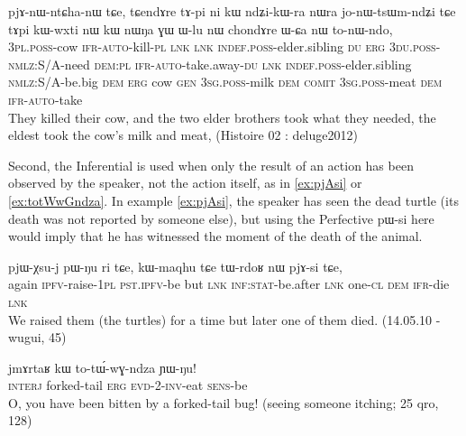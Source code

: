 \documentclass[oldfontcommands,oneside,a4paper,11pt]{article}
\newcommand{\ipa}[1]{{\phon \mbox{#1}}} %
\begin{document}
\begin{exe}
\ex \label{ex:pjAnWntChanW}
\gll  \ipa{nɯ-nɯŋa} 	\ipa{pjɤ-nɯ-ntɕha-nɯ} 	\ipa{tɕe,} \ipa{tɕendɤre} 	\ipa{tɤ-pi} 	\ipa{ni} 	\ipa{kɯ} 	\ipa{ndʑi-kɯ-ra} 	\ipa{nɯra} 	\ipa{jo-nɯ-tsɯm-ndʑi} 	\ipa{tɕe} \ipa{tɤpi} 	\ipa{kɯ-wxti} 	\ipa{nɯ} 	\ipa{kɯ} 	\ipa{nɯŋa} 	\ipa{ɣɯ} 	 \ipa{ɯ-lu} 	\ipa{nɯ} 	\ipa{chondɤre} \ipa{ɯ-ɕa} 	\ipa{nɯ} 	\ipa{to-nɯ-ndo,} \\
\textsc{3pl.poss}-cow \textsc{ifr}-\textsc{auto}-kill-\textsc{pl} \textsc{lnk}  \textsc{lnk} \textsc{indef.poss}-elder.sibling \textsc{du} \textsc{erg} \textsc{3du.poss}-\textsc{nmlz}:S/A-need \textsc{dem:pl} \textsc{ifr}-\textsc{auto}-take.away-\textsc{du} \textsc{lnk} \textsc{indef.poss}-elder.sibling \textsc{nmlz}:S/A-be.big \textsc{dem} \textsc{erg} cow \textsc{gen} \textsc{3sg.poss}-milk \textsc{dem} \textsc{comit}  \textsc{3sg.poss}-meat  \textsc{dem} \textsc{ifr}-\textsc{auto}-take \\
\glt They killed their cow, and the two elder brothers took what they needed, the eldest took the cow's milk and meat, (Histoire 02 : deluge2012)
\end{exe}



Second, the Inferential is used when only the result of an action has been observed by the speaker, not the action itself, as in \ref{ex:pjAsi} or \ref{ex:totWwGndza}. In example \ref{ex:pjAsi}, the speaker has seen the dead turtle (its death was not reported by someone else), but using the Perfective \ipa{pɯ-si}  here would imply that he has witnessed the moment of the death of the animal. 

\begin{exe}
\ex  \label{ex:pjAsi}
\gll \ipa{li} 	\ipa{pjɯ-χsu-j} 	\ipa{pɯ-ŋu} 	\ipa{ri} 	\ipa{tɕe,} \ipa{kɯ-maqhu} 	\ipa{tɕe} 	\ipa{tɯ-rdoʁ} 	\ipa{nɯ} 	\ipa{pjɤ-si} 	\ipa{tɕe,} \\
again \textsc{ipfv}-raise-\textsc{1pl} \textsc{pst.ipfv}-be but \textsc{lnk} \textsc{inf:stat}-be.after \textsc{lnk}  one-\textsc{cl} \textsc{dem} \textsc{ifr}-die \textsc{lnk} \\
\glt We raised them (the turtles) for a time but later one of them died. (14.05.10 - wugui, 45)
\end{exe}


\begin{exe}
\ex \label{ex:totWwGndza}
\gll \ipa{wo}	\ipa{jmɤrtaʁ} 	\ipa{kɯ} 	\ipa{to-tɯ́-wɣ-ndza} 	\ipa{ɲɯ-ŋu!} \\
\textsc{interj} forked-tail \textsc{erg} \textsc{evd-2-inv}-eat \textsc{sens}-be\\
\glt O, you have been bitten by a forked-tail bug! (seeing someone itching; 25 qro, 128)
\end{exe}
\end{document}

